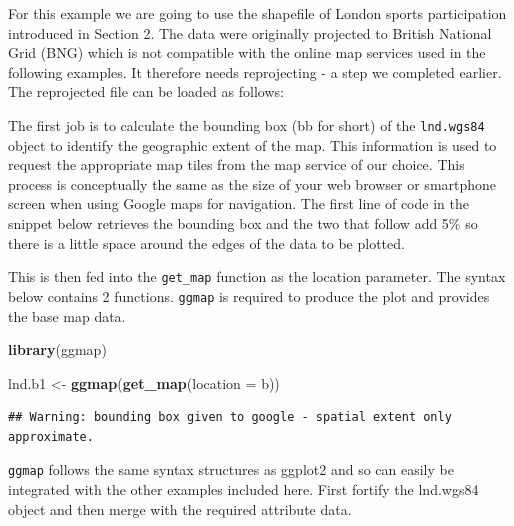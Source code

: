 \documentclass[]{article}
\newenvironment{Shaded}{}{}
\newcommand{\KeywordTok}[1]{\textcolor[rgb]{0.00,0.44,0.13}{\textbf{{#1}}}}
\newcommand{\DataTypeTok}[1]{\textcolor[rgb]{0.56,0.13,0.00}{{#1}}}
\newcommand{\DecValTok}[1]{\textcolor[rgb]{0.25,0.63,0.44}{{#1}}}
\newcommand{\FloatTok}[1]{\textcolor[rgb]{0.25,0.63,0.44}{{#1}}}
\newcommand{\CommentTok}[1]{\textcolor[rgb]{0.38,0.63,0.69}{\textit{{#1}}}}
\newcommand{\NormalTok}[1]{{#1}}
\begin{document}
For this example we are going to use the shapefile of London sports
participation introduced in Section 2. The data were originally
projected to British National Grid (BNG) which is not compatible with
the online map services used in the following examples. It therefore
needs reprojecting - a step we completed earlier. The reprojected file
can be loaded as follows:

The first job is to calculate the bounding box (bb for short) of the
\texttt{lnd.wgs84} object to identify the geographic extent of the map.
This information is used to request the appropriate map tiles from the
map service of our choice. This process is conceptually the same as the
size of your web browser or smartphone screen when using Google maps for
navigation. The first line of code in the snippet below retrieves the
bounding box and the two that follow add 5\% so there is a little space
around the edges of the data to be plotted.

\begin{Shaded}
\end{Shaded}
This is then fed into the \texttt{get\_map} function as the location
parameter. The syntax below contains 2 functions. \texttt{ggmap} is
required to produce the plot and provides the base map data.

\begin{Shaded}
\begin{Highlighting}[]
\KeywordTok{library}\NormalTok{(ggmap)}

\NormalTok{lnd.b1 <- }\KeywordTok{ggmap}\NormalTok{(}\KeywordTok{get_map}\NormalTok{(}\DataTypeTok{location =} \NormalTok{b))}
\end{Highlighting}
\end{Shaded}
\begin{verbatim}
## Warning: bounding box given to google - spatial extent only approximate.
\end{verbatim}
\texttt{ggmap} follows the same syntax structures as ggplot2 and so can
easily be integrated with the other examples included here. First
fortify the lnd.wgs84 object and then merge with the required attribute
data.
\end{document}
